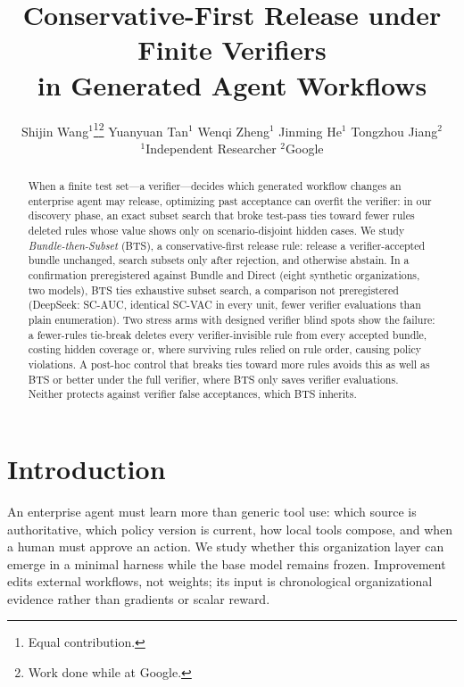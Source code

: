 \documentclass{article}
\title{Conservative-First Release under Finite Verifiers\\in Generated Agent Workflows}
\author{%
  Shijin Wang$^{1}$\thanks{Equal contribution.}\hspace{0.45em}\thanks{Work done while at Google.} \quad
  Yuanyuan Tan$^{1}$\footnotemark[1]\hspace{0.45em}\footnotemark[2] \quad
  Wenqi Zheng$^{1}$ \quad
  Jinming He$^{1}$\footnotemark[2] \quad
  Tongzhou Jiang$^{2}$\\
  $^{1}$Independent Researcher \qquad $^{2}$Google
}
\begin{document}
\maketitle

\begin{abstract}
When a finite test set---a verifier---decides which generated workflow changes an enterprise agent may release, optimizing past acceptance can overfit the verifier: in our discovery phase, an exact subset search that broke test-pass ties toward fewer rules deleted rules whose value shows only on scenario-disjoint hidden cases. We study \emph{Bundle-then-Subset} (BTS), a conservative-first release rule: release a verifier-accepted bundle unchanged, search subsets only after rejection, and otherwise abstain. In a confirmation preregistered against Bundle and Direct (eight synthetic organizations, two models), BTS ties exhaustive subset search, a comparison not preregistered (DeepSeek: \HybridScAuc{} SC-AUC, identical SC-VAC in every unit, \SubsetSearchReduction{} fewer verifier evaluations than plain enumeration). Two stress arms with designed verifier blind spots show the failure: a fewer-rules tie-break deletes every verifier-invisible rule from every accepted bundle, costing hidden coverage or, where surviving rules relied on rule order, causing policy violations. A post-hoc control that breaks ties toward more rules avoids this as well as BTS or better under the full verifier, where BTS only saves verifier evaluations. Neither protects against verifier false acceptances, which BTS inherits.
\end{abstract}

\section{Introduction}

An enterprise agent must learn more than generic tool use: which source is authoritative, which policy version is current, how local tools compose, and when a human must approve an action. We study whether this organization layer can emerge in a minimal harness while the base model remains frozen. Improvement edits external workflows, not weights; its input is chronological organizational evidence rather than gradients or scalar reward.
\end{document}
